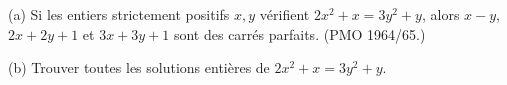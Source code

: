 (a) Si les entiers strictement positifs $x, y$ vérifient $2x^2 + x = 3y^2 + y$, alors $x - y$, $2x + 2y + 1$ et $3x + 3y + 1$ sont des carrés parfaits. (PMO 1964/65.)

(b) Trouver toutes les solutions entières de $2x^2 + x = 3y^2 + y$.

